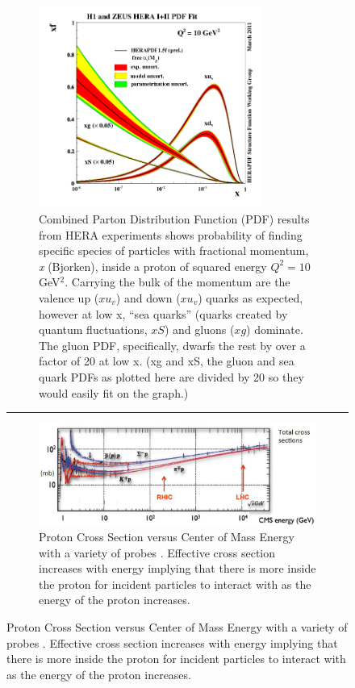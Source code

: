 \begin{figure}
\centering
\begin{subfigure}[p]{0.8\textwidth}
  \centering
    \includegraphics[width=0.8\textwidth]{prevplots/herapdf15f_alpha.png}
  \caption[H1 and ZEUS Parton Distribution Functions]{Combined Parton Distribution Function (PDF) results from HERA experiments\citep{Abramowicz2015} shows probability of finding specific species of particles with fractional momentum, \textit{x} (Bjorken), inside a proton of squared energy $Q^2 = 10$ GeV$^2$. Carrying the bulk of the momentum are the valence up ($xu_v$) and down ($xu_v$) quarks as expected, however at low x, ``sea quarks'' (quarks created by quantum fluctuations, $xS$) and gluons ($xg$) dominate. The gluon PDF, specifically, dwarfs the rest by over a factor of 20 at low x. (xg and xS, the gluon and sea quark PDFs as plotted here are divided by 20 so they would easily fit on the graph.)}
  \label{fig:HERAPDF}
\end{subfigure}
    \rule{35em}{0.5pt}
\begin{subfigure}[p]{0.8\textwidth}
  \centering
    \includegraphics[width=1\textwidth]{prevplots/protoncrosssection.JPG}
  \caption[Proton Cross Section vs Center of Mass Energy.]{Proton Cross Section versus Center of Mass Energy with a variety of probes \citep{PDGcrosssection}\citep{Itakura2012}. Effective cross section increases with energy implying that there is more inside the proton for incident particles to interact with as the energy of the proton increases.}
  \label{fig:PDGxsection}
\end{subfigure}
\end{figure}

